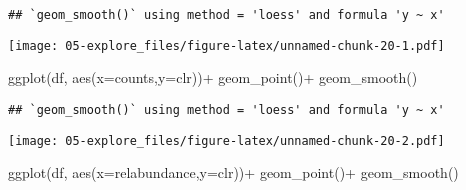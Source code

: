 \documentclass[
  oneside]{book}
\newenvironment{Shaded}{\begin{snugshade}}{\end{snugshade}}
\newcommand{\AttributeTok}[1]{\textcolor[rgb]{0.77,0.63,0.00}{#1}}
\newcommand{\CommentTok}[1]{\textcolor[rgb]{0.56,0.35,0.01}{\textit{#1}}}
\newcommand{\FunctionTok}[1]{\textcolor[rgb]{0.00,0.00,0.00}{#1}}
\newcommand{\NormalTok}[1]{#1}
\newcommand{\OtherTok}[1]{\textcolor[rgb]{0.56,0.35,0.01}{#1}}
\newcommand{\SpecialCharTok}[1]{\textcolor[rgb]{0.00,0.00,0.00}{#1}}
\newcommand{\StringTok}[1]{\textcolor[rgb]{0.31,0.60,0.02}{#1}}
\begin{document}
\begin{Shaded}
\end{Shaded}

\begin{verbatim}
## `geom_smooth()` using method = 'loess' and formula 'y ~ x'
\end{verbatim}

\texttt{[image: 05-explore\_files/figure-latex/unnamed-chunk-20-1.pdf]}

\begin{Shaded}
\begin{Highlighting}[]
\FunctionTok{ggplot}\NormalTok{(df, }\FunctionTok{aes}\NormalTok{(}\AttributeTok{x=}\NormalTok{counts,}\AttributeTok{y=}\NormalTok{clr))}\SpecialCharTok{+}
  \FunctionTok{geom\_point}\NormalTok{()}\SpecialCharTok{+}
  \FunctionTok{geom\_smooth}\NormalTok{()}
\end{Highlighting}
\end{Shaded}

\begin{verbatim}
## `geom_smooth()` using method = 'loess' and formula 'y ~ x'
\end{verbatim}

\texttt{[image: 05-explore\_files/figure-latex/unnamed-chunk-20-2.pdf]}

\begin{Shaded}
\begin{Highlighting}[]
\FunctionTok{ggplot}\NormalTok{(df, }\FunctionTok{aes}\NormalTok{(}\AttributeTok{x=}\NormalTok{relabundance,}\AttributeTok{y=}\NormalTok{clr))}\SpecialCharTok{+}
  \FunctionTok{geom\_point}\NormalTok{()}\SpecialCharTok{+}
  \FunctionTok{geom\_smooth}\NormalTok{()}
\end{Highlighting}
\end{Shaded}
\end{document}
